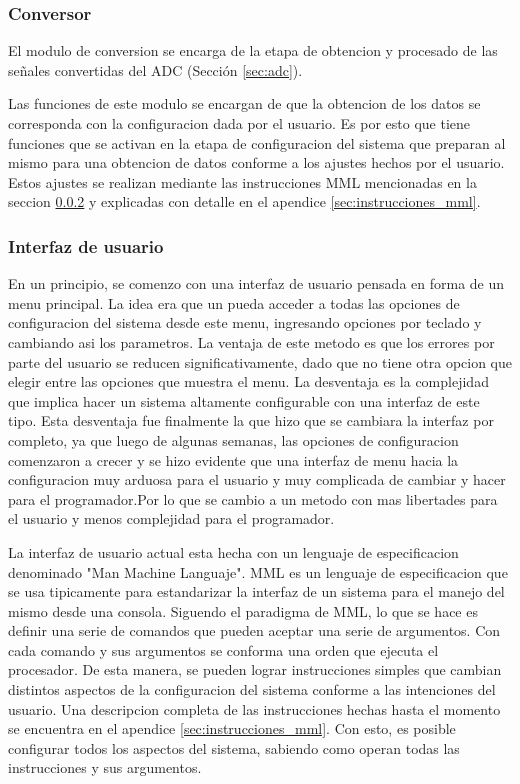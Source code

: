 \subsubsection{Conversor}\label{sec:conversorsw}
El modulo de conversion se encarga de la etapa de obtencion y procesado de las se\~nales convertidas del ADC (Secci\'on \ref{sec:adc}).

Las funciones de este modulo se encargan de que la obtencion de los datos se corresponda con la configuracion dada por el usuario. Es por esto que tiene funciones que se activan en la etapa de configuracion del sistema que preparan al mismo para una obtencion de datos conforme a los ajustes hechos por el usuario. Estos ajustes se realizan mediante las instrucciones MML mencionadas en la seccion \ref{secc:interfaz} y explicadas con detalle en el apendice \ref{sec:instrucciones_mml}.


\subsubsection{Interfaz de usuario}\label{secc:interfaz}
En un principio, se comenzo con una interfaz de usuario pensada en forma de un menu principal. La idea era que un pueda acceder a todas las opciones de configuracion del sistema desde este menu, ingresando opciones por teclado y cambiando asi los parametros. La ventaja de este metodo es que los errores por parte del usuario se reducen significativamente, dado que no tiene otra opcion que elegir entre las opciones que muestra el menu. La desventaja es la complejidad que implica hacer un sistema altamente configurable con una interfaz de este tipo. Esta desventaja fue finalmente la que hizo que se cambiara la interfaz por completo, ya que luego de algunas semanas, las opciones de configuracion comenzaron a crecer y se hizo evidente que una interfaz de menu hacia la configuracion muy arduosa para el usuario y muy complicada de cambiar y hacer para el programador.Por lo que se cambio a un metodo con mas libertades para el usuario y menos complejidad para el programador.

La interfaz de usuario actual esta hecha con un lenguaje de especificacion denominado "Man Machine Languaje". MML es un lenguaje de especificacion que se usa tipicamente para estandarizar la interfaz de un sistema para el manejo del mismo desde una consola. Siguendo el paradigma de MML, lo que se hace es definir una serie de comandos que pueden aceptar una serie de argumentos. Con cada comando y sus argumentos se conforma una orden que ejecuta el procesador. De esta manera, se pueden lograr instrucciones simples que cambian distintos aspectos de la configuracion del sistema conforme a las intenciones del usuario. Una descripcion completa de las instrucciones hechas hasta el momento se encuentra en el apendice \ref{sec:instrucciones_mml}. Con esto, es posible configurar todos los aspectos del sistema, sabiendo como operan todas las instrucciones y sus argumentos.


